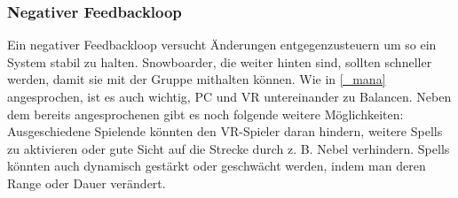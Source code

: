 \subsubsection{Negativer Feedbackloop\label{_rubberbanding}}
Ein negativer Feedbackloop versucht Änderungen entgegenzusteuern um so ein System stabil zu halten\cite[S.133]{_game_design_workshop}. Snowboarder, die weiter hinten sind, sollten schneller werden, damit sie mit der Gruppe mithalten können. Wie in \ref{_mana} angesprochen, ist es auch wichtig, PC und VR untereinander zu Balancen. Neben dem bereits angesprochenen gibt es noch folgende weitere Möglichkeiten: Ausgeschiedene Spielende könnten den VR-Spieler daran hindern, weitere Spells zu aktivieren oder gute Sicht auf die Strecke durch z. B. Nebel verhindern. Spells könnten auch dynamisch gestärkt oder geschwächt werden, indem man deren Range oder Dauer verändert.
